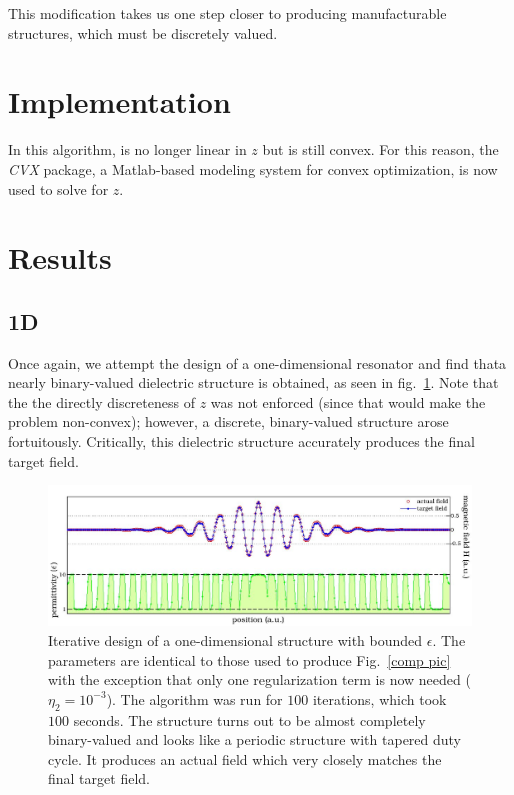 This modification takes us one step closer to producing manufacturable structures,
    which must be discretely valued.

\section{Implementation} 
In this algorithm,  is no longer linear in $z$
    but is still convex\cite{BV04}.
For this reason, the \emph{CVX} package\cite{CVX}, 
    a Matlab-based modeling system for convex optimization, 
    is now used to solve  for $z$.

\section{Results}
\subsection{1D}
Once again, we attempt the design of a one-dimensional resonator
    and find thata nearly binary-valued dielectric structure is obtained,
    as seen in fig.~\ref{bounded comp pic}.
Note that the the directly discreteness of $z$ was not enforced (since that would make the problem non-convex); 
    however, a discrete, binary-valued structure arose fortuitously. 
Critically, this dielectric structure accurately produces the final target field. 

\begin{figure}[htbp]\centering
\includegraphics[width=\textwidth]{p1/bounded}
\caption{Iterative design of a one-dimensional structure with bounded $\epsilon$. 
    The parameters are identical to those used to produce Fig.~\ref{comp pic} with the exception that only one regularization term is now needed ($\eta_2=10^{-3}$). The algorithm was run for $100$ iterations, which took $100$ seconds. The structure turns out to be almost completely binary-valued and looks like a periodic structure with tapered duty cycle. It produces an actual field which very closely matches the final target field.}
\label{bounded comp pic}
\end{figure}

